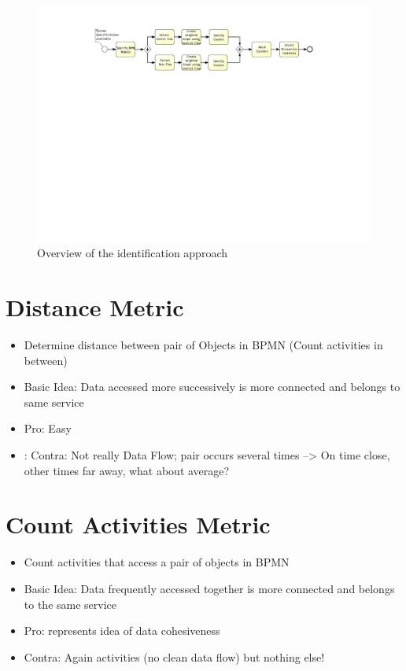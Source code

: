  
\begin{figure}[h!]
	\includegraphics[width=\textwidth, trim={7.5cm 15.3cm 5.0cm 1.5cm}]{img/ThesisProcess.pdf}
	\caption{Overview of the identification approach}
	\label{fig:thesisProcess}
\end{figure}












\section{Distance Metric}
\begin{itemize}
	\item Determine distance between pair of Objects in BPMN (Count activities in between)
	\item Basic Idea: Data accessed more successively is more connected and belongs to same service
	\item Pro: Easy
	\item: Contra: Not really Data Flow; pair  occurs several times --> On time close, other times far away, what about average?
\end{itemize}

\section{Count Activities Metric}
\begin{itemize}
	\item Count activities that access a pair of objects in BPMN
	\item Basic Idea: Data frequently accessed together is more connected and belongs to the same service
	\item Pro: represents idea of data cohesiveness
	\item Contra: Again activities (no clean data flow) but nothing else!

\end{itemize}





